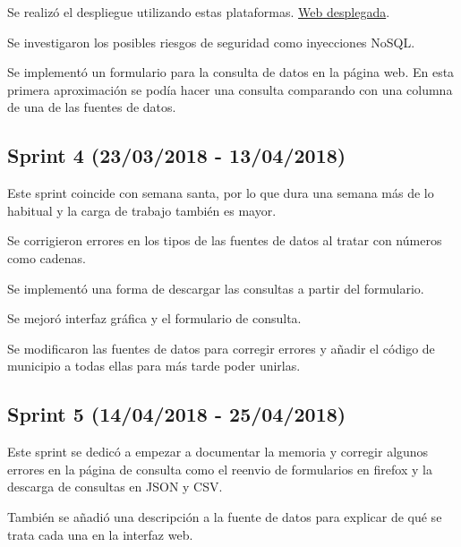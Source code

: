 Se realizó el despliegue utilizando estas plataformas. \href{http://tfg-datos-publicos.nanoapp.io/}{Web desplegada}.

Se investigaron los posibles riesgos de seguridad como inyecciones NoSQL.

Se implementó un formulario para la consulta de datos en la página web. En esta primera aproximación se podía hacer una consulta comparando con una columna de una de las fuentes de datos.



\subsection{Sprint 4 (23/03/2018 - 13/04/2018)}

Este sprint coincide con semana santa, por lo que dura una semana más de lo habitual y la carga de trabajo también es mayor.

Se corrigieron errores en los tipos de las fuentes de datos al tratar con números como cadenas. 

Se implementó una forma de descargar las consultas a partir del formulario. 

Se mejoró interfaz gráfica y el formulario de consulta.

Se modificaron las fuentes de datos para corregir errores y añadir el código de municipio a todas ellas para más tarde poder unirlas.



\subsection{Sprint 5 (14/04/2018 - 25/04/2018)}

Este sprint se dedicó a empezar a documentar la memoria y corregir algunos errores en la página de consulta como el reenvio de formularios en firefox y la descarga de consultas en JSON y CSV.

También se añadió una descripción a la fuente de datos para explicar de qué se trata cada una en la interfaz web.


